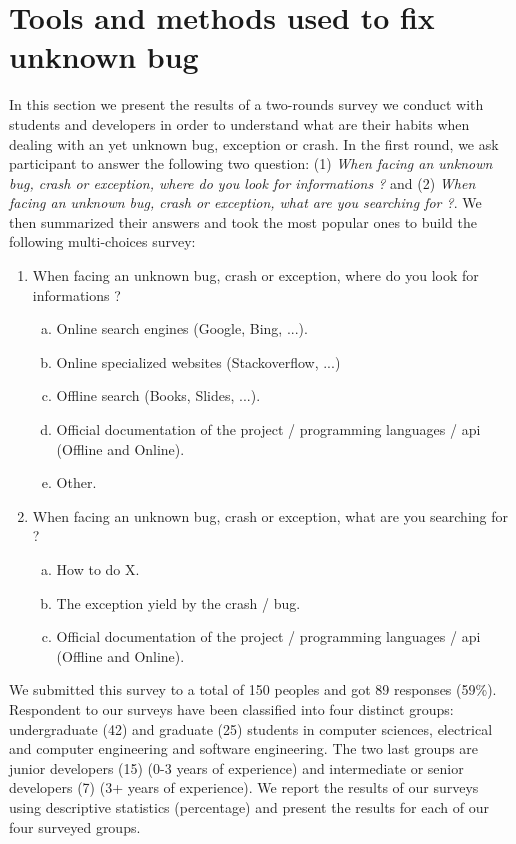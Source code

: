 \documentclass[conference]{IEEEtran}
\begin{document}
\section{Tools and methods used to fix unknown bug}
\label{sec:Tools and methods used to fix unknown bug}

In this section we present the results of a two-rounds survey we conduct with students and developers in order to understand what are their habits when dealing with an yet unknown bug, exception or crash. In the first round, we ask participant to answer the following two question: (1) \textit{When facing an unknown bug, crash or exception, where do you look for informations ?} and (2) \textit{When facing an unknown bug, crash or exception, what are you searching for ?}. We then summarized their answers and took the most popular ones to build the following multi-choices survey:

\begin{enumerate}
  \item When facing an unknown bug, crash or exception, where do you look for informations ?
  \begin{enumerate}[a)]
    \item Online search engines (Google, Bing, ...).
    \item Online specialized websites (Stackoverflow, ...)
    \item Offline search (Books, Slides, ...).
    \item Official documentation of the project / programming languages / api (Offline and Online).
    \item Other.
  \end{enumerate}
  \item When facing an unknown bug, crash or exception, what are you searching for ?
  \begin{enumerate}[a)]
    \item How to do X.
    \item The exception yield by the crash / bug.
    \item Official documentation of the project / programming languages / api (Offline and Online).
  \end{enumerate}
\end{enumerate}

We submitted this survey to a total of 150 peoples and got 89 responses (59\%). Respondent to our surveys have been classified into four distinct groups: undergraduate (42) and graduate (25) students in computer sciences, electrical and computer engineering and software engineering. The two last groups are junior developers (15) (0-3 years of experience) and intermediate or senior developers (7) (3+ years of experience).
We report the results of our surveys using descriptive statistics (percentage) and present the results for each of our four surveyed groups.
\end{document}
